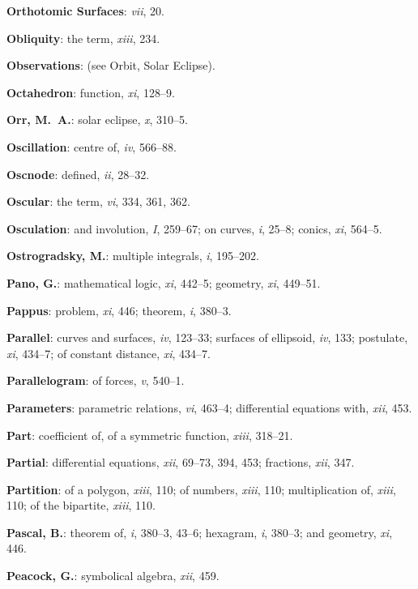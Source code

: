 \documentclass[11pt,a4paper]{article}
\newcommand{\IndexEntry}[1]{\textbf{#1}}
\newcommand{\V}[1]{\textit{#1}} %
\begin{document}
\IndexEntry{Orthotomic Surfaces}: \V{vii}, 20.

\newpage

\setcounter{page}{115}

\IndexEntry{Obliquity}: the term, \V{xiii}, 234.

\IndexEntry{Observations}: (see Orbit, Solar Eclipse).

\IndexEntry{Octahedron}: function, \V{xi}, 128--9.

\IndexEntry{Orr, M.\ A.}: solar eclipse, \V{x}, 310--5.

\IndexEntry{Oscillation}: centre of, \V{iv}, 566--88.

\IndexEntry{Oscnode}: defined, \V{ii}, 28--32.

\IndexEntry{Oscular}: the term, \V{vi}, 334, 361, 362.

\IndexEntry{Osculation}: and involution, \V{I}, 259--67; on curves, \V{i}, 25--8; conics, \V{xi}, 564--5.

\IndexEntry{Ostrogradsky, M.}: multiple integrals, \V{i}, 195--202.

\IndexEntry{Pano, G.}: mathematical logic, \V{xi}, 442--5; geometry, \V{xi}, 449--51.

\IndexEntry{Pappus}: problem, \V{xi}, 446; theorem, \V{i}, 380--3.

\IndexEntry{Parallel}: curves and surfaces, \V{iv}, 123--33; surfaces of ellipsoid, \V{iv}, 133; postulate, \V{xi}, 434--7; of constant distance, \V{xi}, 434--7.

\IndexEntry{Parallelogram}: of forces, \V{v}, 540--1.

\IndexEntry{Parameters}: parametric relations, \V{vi}, 463--4; differential equations with, \V{xii}, 453.

\IndexEntry{Part}: coefficient of, of a symmetric function, \V{xiii}, 318--21.

\IndexEntry{Partial}: differential equations, \V{xii}, 69--73, 394, 453; fractions, \V{xii}, 347.

\IndexEntry{Partition}: of a polygon, \V{xiii}, 110; of numbers, \V{xiii}, 110; multiplication of, \V{xiii}, 110; of the bipartite, \V{xiii}, 110.

\IndexEntry{Pascal, B.}: theorem of, \V{i}, 380--3, 43--6; hexagram, \V{i}, 380--3; and geometry, \V{xi}, 446.

\IndexEntry{Peacock, G.}: symbolical algebra, \V{xii}, 459.
\end{document}

